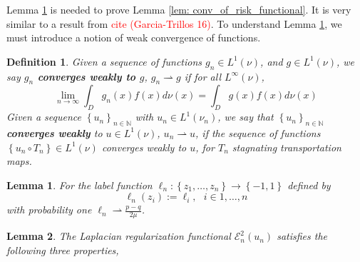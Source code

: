\documentclass{article}
\newcommand{\set}[1]{\left\{#1\right\}}
\newcommand{\seq}[1]{\set{#1}_{n \in \N}}
\newcommand{\N}{\mathbb{N}}
\newcommand{\E}{\mathcal{E}}
\newcommand{\1}{\mathbf{1}}
\theoremstyle{alden}
\newtheorem{definition}{Definition}[section]
\theoremstyle{aldenthm}
\newtheorem{lemma}{Lemma}
\theoremstyle{remark}
\begin{document}
Lemma \ref{lem: weak_limit_of_label_function} is needed to prove Lemma \ref{lem: conv_of_risk_functional}. It is very similar to a result from \textcolor{red}{cite (Garcia-Trillos 16)}. To understand Lemma \ref{lem: weak_limit_of_label_function}, we must introduce a notion of weak convergence of functions.

\begin{definition}
	Given a sequence of functions $g_n \in L^1(\nu)$, and $g \in L^1(\nu)$, we say \textbf{$g_n$ converges weakly to $g$}, $g_n \rightharpoonup g$ if for all $L^{\infty}(\nu)$,
	\begin{equation*}
	\lim_{n \to \infty} \int_D g_n(x) f(x) d\nu(x) = \int_D g(x) f(x) d\nu(x)
	\end{equation*}
	Given a sequence $\seq{u_n}$ with $u_n \in L^1(\nu_n)$, we say that $\seq{u_n}$ \textbf{converges weakly} to $u \in L^1(\nu)$, $u_n \rightharpoonup u$,  if the sequence of functions $\set{u_n \circ T_n} \in L^1(\nu)$ converges weakly to $u$, for $T_n$ stagnating transportation maps.
\end{definition}

\begin{lemma}
	\label{lem: weak_limit_of_label_function}
	For the label function $\ell_n: \set{z_1, \ldots, z_n} \to \set{-1,1}$ defined by
	\begin{equation}
	\label{eqn: label_function}
	\ell_n(z_i) := \ell_i, ~~~ i \in 1,\ldots,n
	\end{equation}
	with probability one $\ell_n \rightharpoonup \frac{p - q}{2 \mu}$. 
\end{lemma}

\begin{lemma}
	\label{lem: gamma_convergence_of_energy_function}
	The Laplacian regularization functional $\E_n^2(u_n)$ satisfies the following three properties, 
\end{lemma}
\end{document}

